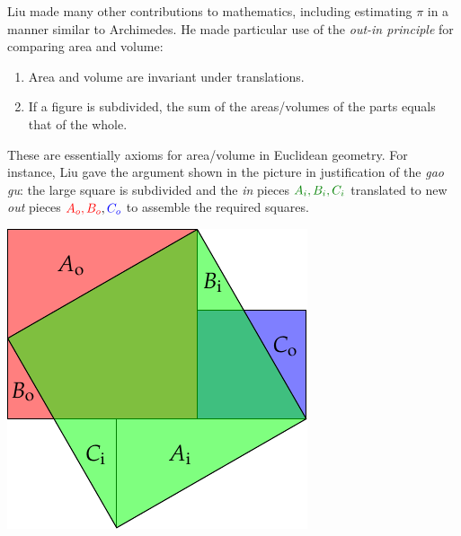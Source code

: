 \begin{minipage}[t]{0.64\linewidth}\vspace{0pt}

Liu made many other contributions to mathematics, including estimating $\pi$ in a manner similar to Archimedes. He made particular use of the \emph{out-in principle} for comparing area and volume:\medskip

\begin{enumerate}\itemsep0pt
  \item Area and volume are invariant under translations.
  \item If a figure is subdivided, the sum of the areas/volumes of the parts equals that of the whole.
\end{enumerate}
These are essentially axioms for area/volume in Euclidean geometry. For instance, Liu gave the argument shown in the picture in justification of the \emph{gao gu}: the large square is subdivided and the \emph{in} pieces $\textcolor{Green}{A_i,B_i,C_i}$ translated to new \emph{out} pieces $\textcolor{red}{A_o,B_o},\textcolor{blue}{C_o}$ to assemble the required squares.
\end{minipage}
\hfill
\begin{minipage}[t]{0.33\linewidth}\vspace{0pt}
	\flushright\includegraphics[scale=0.95]{outin}
\end{minipage}\medbreak

